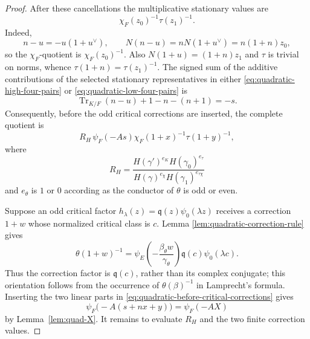 \documentclass[11pt]{amsart}
\theoremstyle{definition}
\theoremstyle{remark}
\newcommand{\Tr}{\operatorname{Tr}}
\begin{document}
\begin{proof}
After these cancellations the multiplicative stationary values are
\begin{equation}\label{eq:quadratic-multiplicative-exact}
 \chi_F(z_0)^{-1}\tau(z_1)^{-1}.
\end{equation}
Indeed,
\[
 n-u=-u(1+u^\vee),\qquad
 N(n-u)=nN(1+u^\vee)=n(1+n)z_0,
\]
so the $\chi_F$-quotient is $\chi_F(z_0)^{-1}$.  Also
$N(1+u)=(1+n)z_1$ and $\tau$ is trivial on norms, whence
$\tau(1+n)=\tau(z_1)^{-1}$.  The signed sum of the additive contributions of the selected stationary
representatives in either \eqref{eq:quadratic-high-four-pairs} or
\eqref{eq:quadratic-low-four-pairs} is
\[
 \Tr_{K/F}(n-u)+1-n-(n+1)=-s.
\]
Consequently, before the odd critical corrections are inserted, the
complete quotient is
\begin{equation}\label{eq:quadratic-before-critical-corrections}
 R_H\,\psi_F(-As)\chi_F(1+x)^{-1}\tau(1+y)^{-1},
\end{equation}
where
\begin{equation}\label{eq:quadratic-raw-Hasse-quotient}
 R_H=
 \frac{H(\gamma')^{e_K}H(\gamma_0)^{e_\tau}}
      {H(\gamma)^{e_\chi}H(\gamma_1)^{e_{\tau\chi}}}
\end{equation}
and $e_\theta$ is $1$ or $0$ according as the conductor of $\theta$
is odd or even.

Suppose an odd critical factor
$h_\lambda(z)=\mathfrak q(z)\psi_0(\lambda z)$ receives a correction
$1+w$ whose normalized critical class is $c$.  Lemma
\ref{lem:quadratic-correction-rule} gives
\begin{equation}\label{eq:quadratic-residual-correction}
 \theta(1+w)^{-1}
 =\psi_E\!\left(-\frac{\beta_\theta w}{\gamma_\theta}\right)
  \mathfrak q(c)\psi_0(\lambda c).
\end{equation}
Thus the correction factor is $\mathfrak q(c)$, rather than its complex
conjugate; this orientation follows from the occurrence of
$\theta(\beta)^{-1}$ in Lamprecht's formula.  Inserting the two linear
parts in \eqref{eq:quadratic-before-critical-corrections} gives
\begin{equation}\label{eq:quadratic-elementary-assembly}
 \psi_F\bigl(-A(s+nx+y)\bigr)=\psi_F(-AX)
\end{equation}
by Lemma~\ref{lem:quad-X}.  It remains to evaluate $R_H$ and the two
finite correction values.


\end{proof}
\end{document}

